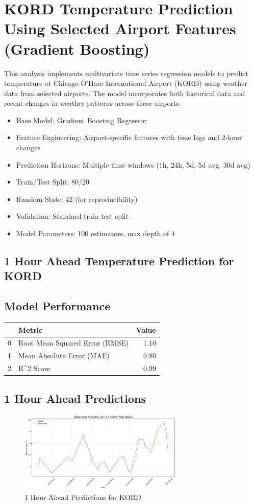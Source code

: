 \section{KORD Temperature Prediction Using Selected Airport Features (Gradient Boosting)}
This analysis implements multivariate time series regression models to predict temperature at Chicago O'Hare International Airport (KORD) using weather data from selected airports. The model incorporates both historical data and recent changes in weather patterns across these airports.\n\begin{itemize}
  \item Base Model: Gradient Boosting Regressor
  \item Feature Engineering: Airport-specific features with time lags and 2-hour changes
  \item Prediction Horizons: Multiple time windows (1h, 24h, 5d, 5d avg, 30d avg)
  \item Train/Test Split: 80/20
  \item Random State: 42 (for reproducibility)
  \item Validation: Standard train-test split
  \item Model Parameters: 100 estimators, max depth of 4
\end{itemize}

\subsection{1 Hour Ahead Temperature Prediction for KORD}
\subsection{Model Performance}
\begin{tabular}{llr}
\toprule
 & Metric & Value \\
\midrule
0 & Root Mean Squared Error (RMSE) & 1.10 \\
1 & Mean Absolute Error (MAE) & 0.80 \\
2 & R^2 Score & 0.99 \\
\bottomrule
\end{tabular}

\subsection{1 Hour Ahead Predictions}
\begin{figure}[htbp]
\centering
\includegraphics[width=0.7\textwidth]{2-0-gradient_boost_temp_shift_results.png}
\caption{1 Hour Ahead Predictions for KORD}
\label{fig:1_hour_ahead_pred}
\end{figure}

